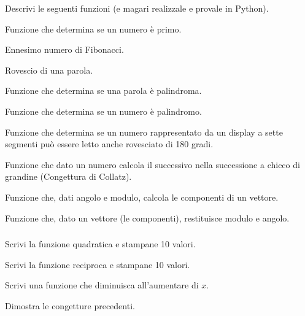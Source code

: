 \begin{esercizio}\label{ese:03.1}
Descrivi le seguenti funzioni (e magari realizzale e provale in Python).
 \begin{enumeratea}
\item Funzione che determina se un numero è primo.
\item Ennesimo numero di Fibonacci.
\item Rovescio di una parola.
\item Funzione che determina se una parola è palindroma.
\item Funzione che determina se un numero è palindromo.
\item Funzione che determina se un numero rappresentato da un display a 
sette segmenti può essere letto anche rovesciato di 180 gradi.
\item Funzione che dato un numero calcola il successivo nella successione a 
chicco di grandine (Congettura di Collatz).
\item Funzione che, dati angolo e modulo, calcola le componenti di un 
vettore.
\item Funzione che, dato un vettore (le componenti), restituisce modulo e 
angolo.
 \end{enumeratea}
\end{esercizio}

\subsubsection*{}

\begin{esercizio}
\label{ese:}
Scrivi la funzione quadratica e stampane 10 valori.
\end{esercizio}

\begin{esercizio}
\label{ese:}
Scrivi la funzione reciproca e stampane 10 valori.
\end{esercizio}

\begin{esercizio}
\label{ese:}
Scrivi una funzione che diminuisca all'aumentare di \(x\).
\end{esercizio}

\begin{esercizio}
\label{ese:}
Dimostra le congetture precedenti.
\end{esercizio}


